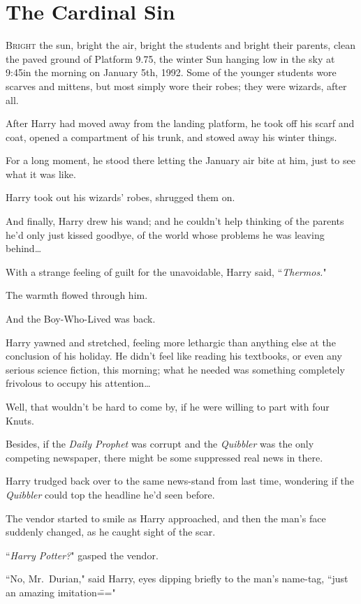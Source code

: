 \chapter{The Cardinal Sin}

\lettrine{B}{right} the sun, bright the air, bright the students and bright their parents, clean the paved ground of Platform 9.75, the winter Sun hanging low in the sky at 9:45\am in the morning on January 5th, 1992. Some of the younger students wore scarves and mittens, but most simply wore their robes; they were wizards, after all.

After Harry had moved away from the landing platform, he took off his scarf and coat, opened a compartment of his trunk, and stowed away his winter things.

For a long moment, he stood there letting the January air bite at him, just to see what it was like.

Harry took out his wizards' robes, shrugged them on.

And finally, Harry drew his wand; and he couldn't help thinking of the parents he'd only just kissed goodbye, of the world whose problems he was leaving behind{\ldots}

With a strange feeling of guilt for the unavoidable, Harry said, ``\emph{Thermos.}"

The warmth flowed through him.

And the Boy-Who-Lived was back.

Harry yawned and stretched, feeling more lethargic than anything else at the conclusion of his holiday. He didn't feel like reading his textbooks, or even any serious science fiction, this morning; what he needed was something completely frivolous to occupy his attention{\ldots}

Well, that wouldn't be hard to come by, if he were willing to part with four Knuts.

Besides, if the \emph{Daily Prophet} was corrupt and the \emph{Quibbler} was the only competing newspaper, there might be some suppressed real news in there.

Harry trudged back over to the same news-stand from last time, wondering if the \emph{Quibbler} could top the headline he'd seen before.

The vendor started to smile as Harry approached, and then the man's face suddenly changed, as he caught sight of the scar.

``\emph{Harry Potter?}" gasped the vendor.

``No, Mr.~Durian," said Harry, eyes dipping briefly to the man's name-tag, ``just an amazing imitation\==="

